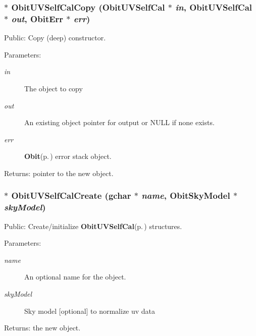 \subsubsection{$\ast$ Obit\-UVSelf\-Cal\-Copy ({\bf Obit\-UVSelf\-Cal} $\ast$ {\em in}, {\bf Obit\-UVSelf\-Cal} $\ast$ {\em out}, {\bf Obit\-Err} $\ast$ {\em err})}\label{ObitUVSelfCal_8h_a8}


Public: Copy (deep) constructor. 

\begin{Desc}
\item[Parameters:]
\begin{description}
\item[{\em in}]The object to copy \item[{\em out}]An existing object pointer for output or NULL if none exists. \item[{\em err}]{\bf Obit}{\rm (p.\,\pageref{structObit})} error stack object. \end{description}
\end{Desc}
\begin{Desc}
\item[Returns:]pointer to the new object. \end{Desc}
\subsubsection{$\ast$ Obit\-UVSelf\-Cal\-Create (gchar $\ast$ {\em name}, {\bf Obit\-Sky\-Model} $\ast$ {\em sky\-Model})}\label{ObitUVSelfCal_8h_a6}


Public: Create/initialize {\bf Obit\-UVSelf\-Cal}{\rm (p.\,\pageref{structObitUVSelfCal})} structures. 

\begin{Desc}
\item[Parameters:]
\begin{description}
\item[{\em name}]An optional name for the object. \item[{\em sky\-Model}]Sky model [optional] to normalize uv data \end{description}
\end{Desc}
\begin{Desc}
\item[Returns:]the new object. \end{Desc}
